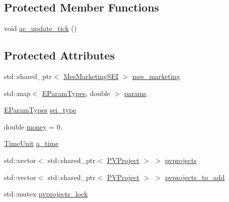 \subsection*{Protected Member Functions}
{\bf }\par
\begin{DoxyCompactItemize}
\item 
void \hyperlink{classsolar__core_1_1_s_e_i_a51873235b9ab1795b5616e672c75e499}{ac\+\_\+update\+\_\+tick} ()
\end{DoxyCompactItemize}

\subsection*{Protected Attributes}
{\bf }\par
\begin{DoxyCompactItemize}
\item 
std\+::shared\+\_\+ptr$<$ \hyperlink{classsolar__core_1_1_mes_marketing_s_e_i}{Mes\+Marketing\+S\+E\+I} $>$ \hyperlink{classsolar__core_1_1_s_e_i_ad5326c45ccd4a5512a6c0a296656264d}{mes\+\_\+marketing}
\end{DoxyCompactItemize}

{\bf }\par
\begin{DoxyCompactItemize}
\item 
std\+::map$<$ \hyperlink{namespacesolar__core_aa1147341e5ef7a40d68d1bd68e149362}{E\+Param\+Types}, double $>$ \hyperlink{classsolar__core_1_1_s_e_i_a811b998092171224983f9aefaa974707}{params}
\item 
\hyperlink{namespacesolar__core_aa1147341e5ef7a40d68d1bd68e149362}{E\+Param\+Types} \hyperlink{classsolar__core_1_1_s_e_i_a788ef7ae27cee8b9b99b57eba9ab2981}{sei\+\_\+type}
\item 
double \hyperlink{classsolar__core_1_1_s_e_i_a8ab5ab03ef726a3354b7c0e0d18da82a}{money} = 0.
\item 
\hyperlink{namespacesolar__core_a4b5949d07259da6f8a20d12a30403e90}{Time\+Unit} \hyperlink{classsolar__core_1_1_s_e_i_abf17b36abf722993d5ad53710579d402}{a\+\_\+time}
\end{DoxyCompactItemize}

{\bf }\par
\begin{DoxyCompactItemize}
\item 
std\+::vector$<$ std\+::shared\+\_\+ptr$<$ \hyperlink{classsolar__core_1_1_p_v_project}{P\+V\+Project} $>$ $>$ \hyperlink{classsolar__core_1_1_s_e_i_a76d9d151e51465d534ff0fd3d64f98bc}{pvprojects}
\item 
std\+::vector$<$ std\+::shared\+\_\+ptr$<$ \hyperlink{classsolar__core_1_1_p_v_project}{P\+V\+Project} $>$ $>$ \hyperlink{classsolar__core_1_1_s_e_i_a99fe003b8fd35b6ef44dec39ed374ffe}{pvprojects\+\_\+to\+\_\+add}
\item 
std\+::mutex \hyperlink{classsolar__core_1_1_s_e_i_adc031a01a6acf03d68b6d0037a2c8a30}{pvprojects\+\_\+lock}
\end{DoxyCompactItemize}

